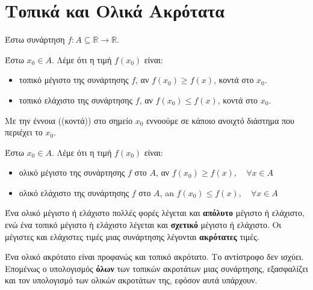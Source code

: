


\everymath{\displaystyle}
\pagestyle{vangelis}




\chapter*{Τοπικά και Ολικά Ακρότατα}



Έστω συνάρτηση $ f \colon A \subseteq \mathbb{R} \to \mathbb{R} $.

\begin{dfn}
    Έστω $ x_{0} \in A $.  Λέμε ότι η τιμή $ f(x_{0}) $ είναι:
    \begin{itemize}
        \item \textcolor{Col1}{τοπικό μέγιστο}\phantom{a} της συνάρτησης $f$, αν $ f(x_{0}) \geq f(x) $, κοντά στο $ x_{0} $.
        \item \textcolor{Col1}{τοπικό ελάχιστο} της συνάρτησης $f$, αν $ f(x_{0}) \leq f(x) $, κοντά στο $ x_{0} $.
    \end{itemize}
\end{dfn}

Με την έννοια ((κοντά)) στο σημείο $ x_{0} $ εννοούμε σε κάποιο ανοιχτό διάστημα που περιέχει το $ x_{0} $.

\begin{dfn}
    Έστω $ x_{0} \in A $.  Λέμε ότι η τιμή $ f(x_{0}) $ είναι:
    \begin{itemize}
        \item \textcolor{Col1}{ολικό μέγιστο}\phantom{a} της συνάρτησης $f$ στο $ A $, αν $ f(x_{0}) \geq f(x),\quad \forall x \in A $
        \item \textcolor{Col1}{ολικό ελάχιστο} της συνάρτησης $f$ στο $ A $, an $ f(x_{0}) \leq f(x),\quad \forall x
            \in A $
    \end{itemize}
\end{dfn}

Ένα ολικό μέγιστο ή ελάχιστο πολλές φορές λέγεται και \textbf{απόλυτο} μέγιστο ή ελάχιστο, ενώ ένα
τοπικό μέγιστο ή ελάχιστο λέγεται και \textbf{σχετικό} μέγιστο ή ελάχιστο. Οι μέγιστες και
ελάχιστες τιμές μιας συνάρτησης λέγονται \textbf{ακρότατες} τιμές.

\begin{rem}
    Ένα ολικό ακρότατο είναι προφανώς και τοπικό ακρότατο. Το αντίστροφο δεν ισχύει. Επομένως ο
    υπολογισμός \textbf{όλων} των τοπικών ακροτάτων μιας συνάρτησης, εξασφαλίζει και τον υπολογισμό
    των ολικών ακροτάτων της, εφόσον αυτά υπάρχουν.
\end{rem}

